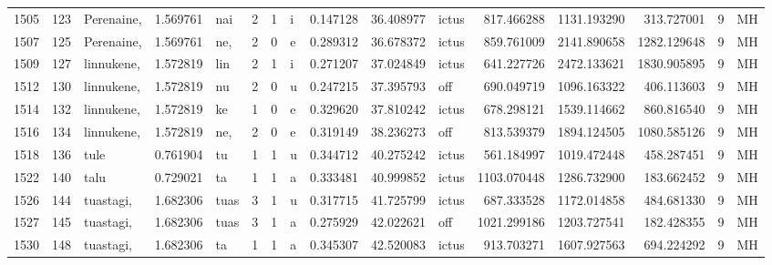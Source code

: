 \begin{tabular}{lrlrllllrrlrrrll}
1505 &         123 &       Perenaine, &  1.569761 &     nai &        2 &      1 &       i &      0.147128 &     36.408977 &  ictus &   817.466288 &  1131.193290 &   313.727001 &      9 &        MH \\
1507 &         125 &       Perenaine, &  1.569761 &     ne, &        2 &      0 &       e &      0.289312 &     36.678372 &  ictus &   859.761009 &  2141.890658 &  1282.129648 &      9 &        MH \\
1509 &         127 &       linnukene, &  1.572819 &     lin &        2 &      1 &       i &      0.271207 &     37.024849 &  ictus &   641.227726 &  2472.133621 &  1830.905895 &      9 &        MH \\
1512 &         130 &       linnukene, &  1.572819 &      nu &        2 &      0 &       u &      0.247215 &     37.395793 &    off &   690.049719 &  1096.163322 &   406.113603 &      9 &        MH \\
1514 &         132 &       linnukene, &  1.572819 &      ke &        1 &      0 &       e &      0.329620 &     37.810242 &  ictus &   678.298121 &  1539.114662 &   860.816540 &      9 &        MH \\
1516 &         134 &       linnukene, &  1.572819 &     ne, &        2 &      0 &       e &      0.319149 &     38.236273 &    off &   813.539379 &  1894.124505 &  1080.585126 &      9 &        MH \\
1518 &         136 &             tule &  0.761904 &      tu &        1 &      1 &       u &      0.344712 &     40.275242 &  ictus &   561.184997 &  1019.472448 &   458.287451 &      9 &        MH \\
1522 &         140 &             talu &  0.729021 &      ta &        1 &      1 &       a &      0.333481 &     40.999852 &  ictus &  1103.070448 &  1286.732900 &   183.662452 &      9 &        MH \\
1526 &         144 &        tuastagi, &  1.682306 &    tuas &        3 &      1 &       u &      0.317715 &     41.725799 &  ictus &   687.333528 &  1172.014858 &   484.681330 &      9 &        MH \\
1527 &         145 &        tuastagi, &  1.682306 &    tuas &        3 &      1 &       a &      0.275929 &     42.022621 &    off &  1021.299186 &  1203.727541 &   182.428355 &      9 &        MH \\
1530 &         148 &        tuastagi, &  1.682306 &      ta &        1 &      1 &       a &      0.345307 &     42.520083 &  ictus &   913.703271 &  1607.927563 &   694.224292 &      9 &        MH \\

\end{tabular}
